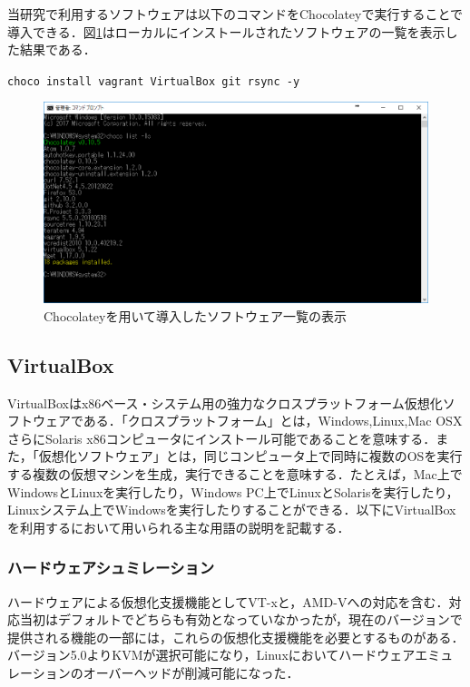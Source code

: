 当研究で利用するソフトウェアは以下のコマンドをChocolateyで実行することで導入できる．図\ref{clist}はローカルにインストールされたソフトウェアの一覧を表示した結果である．

\texttt{choco install vagrant VirtualBox git rsync -y}

\begin{figure}[htb]
\centering
\includegraphics[width=12cm]{images/clist.png}
\caption{Chocolateyを用いて導入したソフトウェア一覧の表示}\label{clist}
\end{figure}

\newpage

\subsection{VirtualBox}

VirtualBox\cite{VirtualBox}はx86ベース・システム用の強力なクロスプラットフォーム仮想化ソフトウェアである．「クロスプラットフォーム」とは，Windows,Linux,Mac OSXさらにSolaris x86コンピュータにインストール可能であることを意味する．また，「仮想化ソフトウェア」とは，同じコンピュータ上で同時に複数のOSを実行する複数の仮想マシンを生成，実行できることを意味する．たとえば，Mac上でWindowsとLinuxを実行したり，Windows PC上でLinuxとSolarisを実行したり，Linuxシステム上でWindowsを実行したりすることができる．以下にVirtualBoxを利用するにおいて用いられる主な用語の説明を記載する．

\subsubsection{ハードウェアシュミレーション}
ハードウェアによる仮想化支援機能としてVT-xと，AMD-Vへの対応を含む．対応当初はデフォルトでどちらも有効となっていなかったが，現在のバージョンで提供される機能の一部には，これらの仮想化支援機能を必要とするものがある．バージョン5.0よりKVMが選択可能になり，Linuxにおいてハードウェアエミュレーションのオーバーヘッドが削減可能になった．

